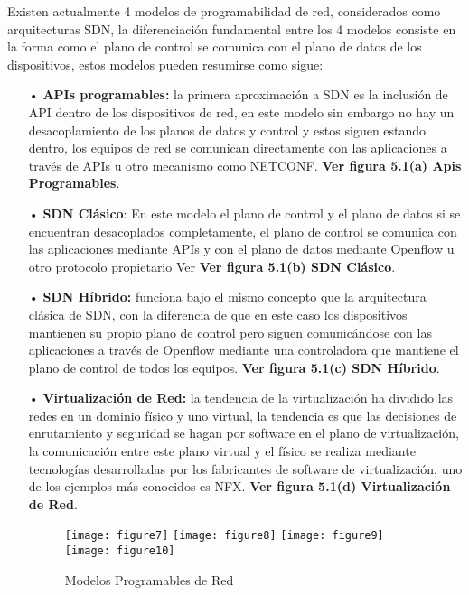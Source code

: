 Existen actualmente 4 modelos de programabilidad de red, considerados como arquitecturas SDN, la diferenciación fundamental entre los 4 modelos consiste en la forma como el plano de control se comunica con el plano de datos de los dispositivos, estos modelos pueden resumirse como sigue:
\begin{itemize}
\item[•] \textbf{APIs programables:}  la primera aproximación a SDN es la inclusión de API dentro de los dispositivos de red, en este modelo sin embargo no hay un desacoplamiento de los planos de datos y control y estos siguen estando dentro, los equipos de red se comunican directamente con las aplicaciones a través de APIs u otro mecanismo como NETCONF. \textbf{Ver figura 5.1(a) Apis Programables}.

\item[•] \textbf{SDN Clásico}: En este modelo el plano de control y el plano de datos si se encuentran desacoplados completamente, el plano de control se comunica con las aplicaciones mediante APIs y con el plano de datos mediante Openflow u otro protocolo propietario Ver \textbf{Ver figura 5.1(b) SDN Clásico}.

\item[•] \textbf{SDN Híbrido:} funciona bajo el mismo concepto que la arquitectura clásica de SDN, con la diferencia de que en este caso los dispositivos mantienen su propio plano de control pero siguen comunicándose con las aplicaciones a través de Openflow mediante una controladora que mantiene el plano de control de todos los equipos. \textbf{Ver figura 5.1(c) SDN Híbrido}.

\item[•]\textbf{Virtualización de Red:} la tendencia de la virtualización ha dividido las redes en un dominio físico y uno virtual, la tendencia es que las decisiones de enrutamiento y seguridad se hagan por software en el plano de virtualización, la comunicación entre este plano virtual y el físico se realiza mediante tecnologías desarrolladas por los fabricantes de software de virtualización, uno de los ejemplos más conocidos es NFX. \textbf{Ver figura 5.1(d) Virtualización de Red}.

\begin{figure}[htbp]
  \centering
    {\texttt{[image: figure7]}}%
    {\texttt{[image: figure8]}}%
    {\texttt{[image: figure9]}}%
    {\texttt{[image: figure10]}}%
  \caption{Modelos Programables de Red}
  \label{fig:fig2subfig}
\end{figure}

\end{itemize}
